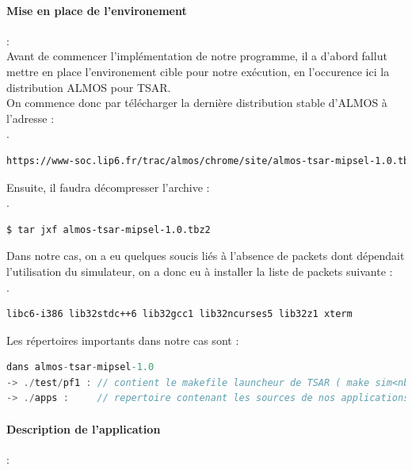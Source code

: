 \paragraph{Mise en place de l'environement}:\\

Avant de commencer l'implémentation de notre programme, il a d'abord fallut mettre en place l'environement cible pour notre exécution, en l'occurence ici la distribution ALMOS pour TSAR.\\

On commence donc par télécharger la dernière distribution stable d'ALMOS à l'adresse :\\
.\\
\begin{DDbox}{\linewidth}
\begin{lstlisting}[language=bash]
https://www-soc.lip6.fr/trac/almos/chrome/site/almos-tsar-mipsel-1.0.tbz2
\end{lstlisting}
\end{DDbox}
Ensuite, il faudra décompresser l'archive :\\
.\\
\begin{DDbox}{\linewidth}
\begin{lstlisting}[language=bash]
$ tar jxf almos-tsar-mipsel-1.0.tbz2
\end{lstlisting}
\end{DDbox}
Dans notre cas, on a eu quelques soucis liés à l'absence de packets dont dépendait l'utilisation du simulateur, on a donc eu à installer la liste de packets suivante :\\
.\\
\begin{DDbox}{\linewidth}
\begin{lstlisting}[language=bash]
libc6-i386 lib32stdc++6 lib32gcc1 lib32ncurses5 lib32z1 xterm
\end{lstlisting}
\end{DDbox}
Les répertoires importants dans notre cas sont :\\
\begin{DDbox}{\linewidth}
\begin{lstlisting}[language=C]
dans almos-tsar-mipsel-1.0
-> ./test/pf1 : // contient le makefile launcheur de TSAR ( make sim<nb_clusters> )
-> ./apps :     // repertoire contenant les sources de nos applications
\end{lstlisting}
\end{DDbox}

\paragraph{Description de l'application}:\\

